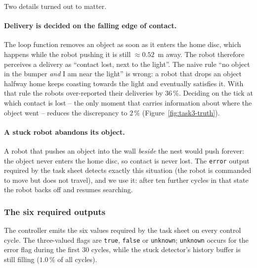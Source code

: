 \documentclass[12pt, a4paper]{article}
\begin{document}
Two details turned out to matter.

\paragraph{Delivery is decided on the falling edge of contact.}
The loop function removes an object as soon as it enters the home disc, which
happens while the robot pushing it is still ${\approx}0.52$~m away.  The robot
therefore perceives a delivery as ``contact lost, next to the light''.  The
naive rule ``no object in the bumper \emph{and} I am near the light'' is wrong:
a robot that drops an object halfway home keeps coasting towards the light and
eventually satisfies it.  With that rule the robots over-reported their
deliveries by $36\,\%$.  Deciding on the tick at which contact is lost -- the
only moment that carries information about where the object went -- reduces the
discrepancy to $2\,\%$ (Figure~\ref{fig:task3-truth}).

\paragraph{A stuck robot abandons its object.}
A robot that pushes an object into the wall \emph{beside} the nest would push
forever: the object never enters the home disc, so contact is never lost.  The
\texttt{error} output required by the task sheet detects exactly this situation
(the robot is commanded to move but does not travel), and we use it: after ten
further cycles in that state the robot backs off and resumes searching.

\subsubsection{The six required outputs}

The controller emits the six values required by the task sheet on every control
cycle.  The three-valued flags are \texttt{true}, \texttt{false} or
\texttt{unknown}; \texttt{unknown} occurs for the error flag during the first
$30$ cycles, while the stuck detector's history buffer is still filling
($1.0\,\%$ of all cycles).
\end{document}

